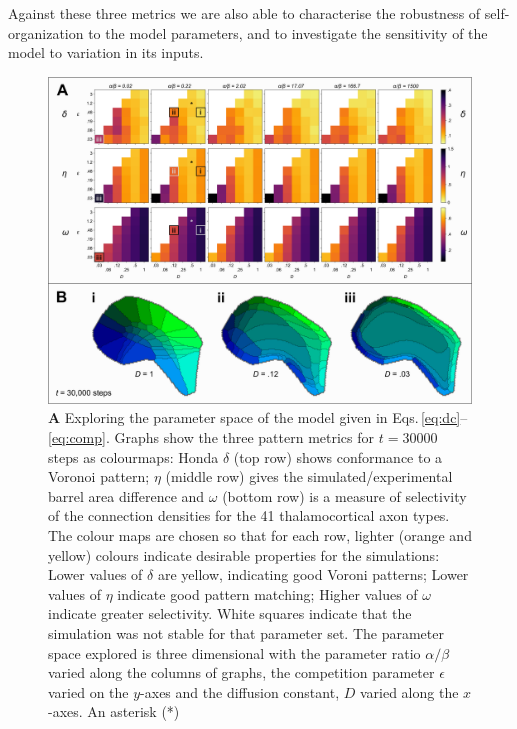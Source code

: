 \documentclass[9pt,lineno]{elife}
\newcommand{\MPthreePar}[1]{\textcolor{colmpthreepar}{#1}}
\newcommand{\metrics}[1]{\textcolor{colmetrics}{#1}}
\begin{document}
\metrics{Against these three metrics we are also able to characterise the
  robustness of self-organization to the model parameters, and to investigate
  the sensitivity of the model to variation in its inputs.}

\begin{figure}
  \begin{fullwidth}
    \includegraphics[width=\linewidth]{./Fig2.png}
    \caption{\MPthreePar{\textbf{A} Exploring the parameter space of the
        model given in Eqs.\,\ref{eq:dc}--\ref{eq:comp}. Graphs show the three
        pattern metrics for $t=30000$ steps as colourmaps: Honda $\delta$ (top
        row) shows conformance to a Voronoi pattern; $\eta$ (middle row) gives
        the simulated/experimental barrel area difference and $\omega$ (bottom
        row) is a measure of selectivity of the connection densities for the
        41 thalamocortical axon types. The colour maps are chosen so that for
        each row, lighter (orange and yellow) colours indicate desirable
        properties for the simulations: Lower values of $\delta$ are yellow,
        indicating good Voroni patterns; Lower values of $\eta$ indicate good
        pattern matching; Higher values of $\omega$ indicate greater
        selectivity. White squares indicate that the simulation was not stable
        for that parameter set.
%
        The parameter space explored is three dimensional with the parameter
        ratio $\alpha/\beta$ varied along the columns of graphs, the
        competition parameter $\epsilon$ varied on the $y$-axes and the
        diffusion constant, $D$ varied along the $x$-axes. An asterisk (*)
}}
\end{fullwidth}
\end{figure}
\end{document}
